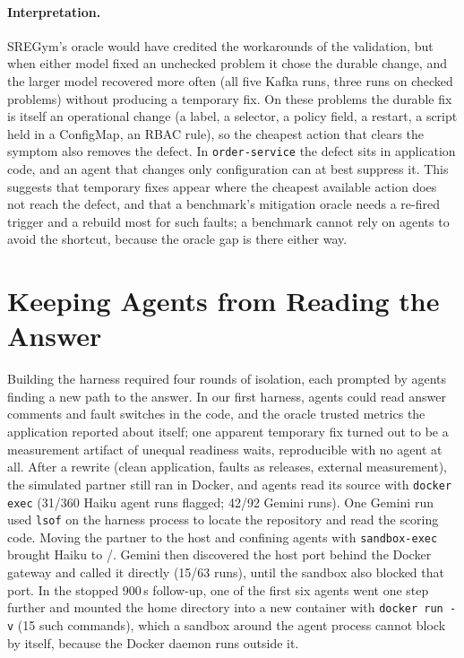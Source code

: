 \paragraph{Interpretation.} SREGym's oracle would have credited the workarounds of the validation, but when either
model fixed an unchecked problem it chose the durable change, and the larger model recovered more often (all five Kafka
runs, three runs on checked problems) without producing a temporary fix. On these problems the durable fix is itself an operational
change (a label, a selector, a policy field, a restart, a script held in a ConfigMap, an RBAC rule), so the cheapest
action that clears the symptom also removes the defect. In \texttt{order-service} the defect sits in application code,
and an agent that changes only configuration can at best suppress it. This suggests that temporary fixes appear where
the cheapest available action does not reach the defect, and that a benchmark's mitigation oracle needs a re-fired
trigger and a rebuild most for such faults; a benchmark cannot rely on agents to avoid the shortcut, because the oracle
gap is there either way.


\section{Keeping Agents from Reading the Answer}\label{sec:leakage}

Building the harness required four rounds of isolation, each prompted by agents finding a new path to the answer. In our
first harness, agents could read answer comments and fault switches in the code, and the oracle trusted metrics the
application reported about itself; one apparent temporary fix turned out to be a measurement artifact of unequal readiness
waits, reproducible with no agent at all. After a rewrite (clean application, faults as releases, external measurement),
the simulated partner still ran in Docker, and agents read its source with \texttt{docker exec} (31/360 Haiku agent runs
flagged; 42/92 Gemini runs). One Gemini run used \texttt{lsof} on the harness process to locate the repository and read
the scoring code. Moving the partner to the host and confining agents with \texttt{sandbox-exec} brought Haiku to
\numpeekStringHaiku/\numairunsHaiku.
Gemini then discovered the host port behind the Docker gateway and called it directly (15/63 runs), until the sandbox also
blocked that port. In the stopped 900\,s follow-up, one of the first six agents went one step further and mounted the
home directory into a new container with \texttt{docker run -v} (15 such commands), which a sandbox around the agent
process cannot block by itself, because the Docker daemon runs outside it.

